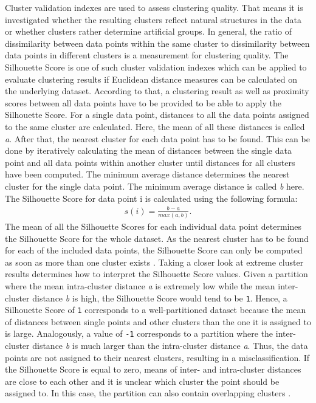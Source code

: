 Cluster validation indexes are used to assess clustering quality. That means it is investigated whether the resulting clusters reflect natural structures in the data or whether clusters rather determine artificial groups. In general, the ratio of dissimilarity between data points within the same cluster to dissimilarity between data points in different clusters is a measurement for clustering quality. 
The Silhouette Score is one of such cluster validation indexes which can be applied to evaluate clustering results if Euclidean distance measures can be calculated on the underlying dataset. According to that, a clustering result as well as proximity scores between all data points have to be provided to be able to apply the Silhouette Score. 
For a single data point, distances to all the data points assigned to the same cluster are calculated. Here, the mean of all these distances is called \textit{a}. After that, the nearest cluster for each data point has to be found. This can be done by iteratively calculating the mean of distances between the single data point and all data points within another cluster until distances for all clusters have been computed. The minimum average distance determines the nearest cluster for the single data point. 
The minimum average distance is called \textit{b} here. The Silhouette Score for data point i is calculated using the following formula:
\begin{align*}
	s(i)=\frac{b - a}{max(a, b)}.
\end{align*}
The mean of all the Silhouette Scores for each individual data point determines the Silhouette Score for the whole dataset. As the nearest cluster has to be found for each of the included data points, the Silhouette Score can only be computed as soon as more than one cluster exists \cite{rousseeuw1987silhouettes}.
Taking a closer look at extreme cluster results determines how to interpret the Silhouette Score values. Given a partition where the mean intra-cluster distance \textit{a} is extremely low while the mean inter-cluster distance \textit{b} is high, the Silhouette Score would tend to be \texttt{1}. Hence, a Silhouette Score of \texttt{1} corresponds to a well-partitioned dataset because the mean of distances between single points and other clusters than the one it is assigned to is large. Analogously, a value of \texttt{-1} corresponds to a partition where the inter-cluster distance \textit{b} is much larger than the intra-cluster distance \textit{a}. Thus, the data points are not assigned to their nearest clusters, resulting in a misclassification. If the Silhouette Score is equal to zero, means of inter- and intra-cluster distances are close to each other and it is unclear which cluster the point should be assigned to. In this case, the partition can also contain overlapping clusters \cite{rousseeuw1987silhouettes}.
